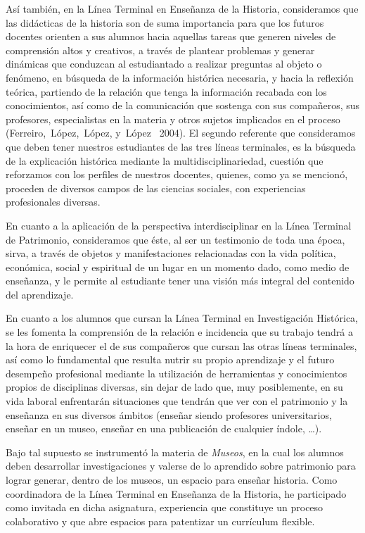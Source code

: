 Así también, en la Línea Terminal en Enseñanza de la Historia, 
consideramos que las didácticas de la historia son de suma importancia para que 
los futuros docentes orienten a sus alumnos hacia aquellas tareas que 
generen niveles de comprensión altos y creativos, a través de plantear 
problemas y generar dinámicas que conduzcan al estudiantado a realizar 
preguntas al objeto o fenómeno, en búsqueda de la información histórica 
necesaria, y  hacia la reflexión teórica, partiendo de la relación que 
tenga la información recabada con los conocimientos, así como de la comunicación que 
sostenga con sus compañeros, sus profesores, especialistas en la materia y otros 
sujetos implicados en el proceso (Ferreiro,~López,~López, y~López~ 2004). 
El segundo referente que consideramos que deben tener nuestros 
estudiantes de las tres líneas terminales, es la búsqueda de la 
explicación histórica mediante la multidisciplinariedad, cuestión que 
reforzamos con los perfiles de nuestros docentes, quienes, como ya se 
mencionó, proceden de diversos campos de las ciencias sociales, con 
experiencias profesionales diversas. 

En cuanto a la aplicación de la perspectiva interdisciplinar en la 
Línea Terminal de Patrimonio, consideramos que éste, al ser 
un testimonio de toda una época, sirva, a través de objetos y 
manifestaciones relacionadas con la vida política, económica, social y 
espiritual de un lugar en un momento dado, como medio de 
enseñanza, y le permite al estudiante tener una visión más integral del 
contenido del aprendizaje. 

En cuanto a los alumnos que cursan la Línea Terminal en Investigación 
Histórica, se les fomenta la comprensión de la relación e incidencia 
que su trabajo tendrá a la hora de enriquecer el de sus compañeros que 
cursan las otras líneas terminales, así como lo fundamental que 
resulta nutrir su propio aprendizaje y el futuro desempeño profesional  
mediante la utilización de herramientas y conocimientos propios de 
disciplinas diversas, sin dejar de lado que, muy posiblemente, en su 
vida laboral enfrentarán situaciones que tendrán que ver con el 
patrimonio y la enseñanza en sus diversos ámbitos (enseñar siendo 
profesores universitarios, enseñar en un museo, enseñar en una 
publicación de cualquier índole, \ldots). 

Bajo tal supuesto se instrumentó  la materia de {\itshape Museos\/}, en la cual los alumnos deben desarrollar investigaciones y valerse de lo
aprendido sobre patrimonio para lograr generar, dentro de los museos, un espacio para enseñar historia.  Como
coordinadora de la Línea Terminal en Enseñanza de la Historia, he participado como invitada  en dicha asignatura,
experiencia que constituye un proceso colaborativo y que abre espacios para patentizar un currículum flexible.

